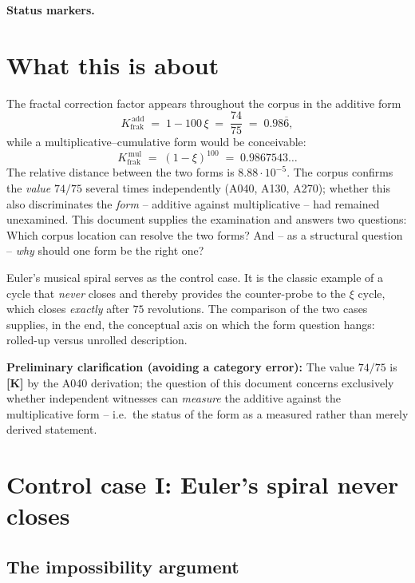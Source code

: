 
\medskip\noindent\textbf{Status markers.}


\section{What this is about}

The fractal correction factor appears throughout the corpus in the
additive form
\[
  K_\text{frak}^{\,\text{add}} \;=\; 1 - 100\,\xi \;=\; \frac{74}{75}
  \;=\; 0.98\overline{6},
\]
while a multiplicative--cumulative form would be conceivable:
\[
  K_\text{frak}^{\,\text{mul}} \;=\; (1-\xi)^{100} \;=\; 0.9867543\ldots
\]
The relative distance between the two forms is $8.88\cdot10^{-5}$. The
corpus confirms the \emph{value} $74/75$ several times independently
(A040, A130, A270); whether this also discriminates the \emph{form} --
additive against multiplicative -- had remained unexamined. This
document supplies the examination and answers two questions: Which
corpus location can resolve the two forms? And -- as a structural
question -- \emph{why} should one form be the right one?

Euler's musical spiral serves as the control case. It is the classic
example of a cycle that \emph{never} closes and thereby provides the
counter-probe to the $\xi$ cycle, which closes \emph{exactly} after
$75$ revolutions. The comparison of the two cases supplies, in the end,
the conceptual axis on which the form question hangs: rolled-up versus
unrolled description.

\textbf{Preliminary clarification (avoiding a category error):} The
value $74/75$ is \textbf{[K]} by the A040 derivation; the question of
this document concerns exclusively whether independent witnesses can
\emph{measure} the additive against the multiplicative form -- i.e.\
the status of the form as a measured rather than merely derived
statement.

\section{Control case I: Euler's spiral never closes}

\subsection{The impossibility argument}

